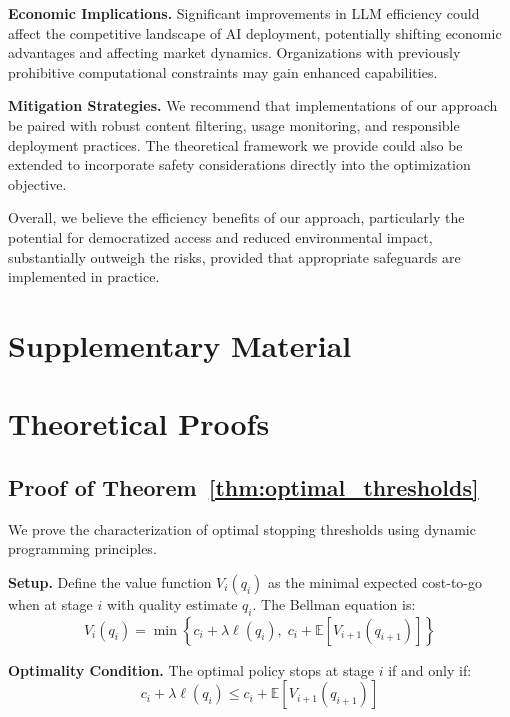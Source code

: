 \documentclass{article}
\theoremstyle{plain}
\theoremstyle{definition}
\theoremstyle{remark}
\begin{document}
\textbf{Economic Implications.} Significant improvements in LLM efficiency could affect the competitive landscape of AI deployment, potentially shifting economic advantages and affecting market dynamics. Organizations with previously prohibitive computational constraints may gain enhanced capabilities.

\textbf{Mitigation Strategies.} We recommend that implementations of our approach be paired with robust content filtering, usage monitoring, and responsible deployment practices. The theoretical framework we provide could also be extended to incorporate safety considerations directly into the optimization objective.

Overall, we believe the efficiency benefits of our approach, particularly the potential for democratized access and reduced environmental impact, substantially outweigh the risks, provided that appropriate safeguards are implemented in practice.





\newpage
\appendix
\onecolumn

\section*{\LARGE Supplementary Material}
\label{sec:appendix}

\section{Theoretical Proofs}
\label{app:proofs}

\subsection{Proof of Theorem~\ref{thm:optimal_thresholds}}

We prove the characterization of optimal stopping thresholds using dynamic programming principles.

\textbf{Setup.} Define the value function $V_i(q_i)$ as the minimal expected cost-to-go when at stage $i$ with quality estimate $q_i$. The Bellman equation is:
\begin{equation}
V_i(q_i) = \min\left\{c_i + \lambda \ell(q_i), \; c_i + \mathbb{E}[V_{i+1}(q_{i+1})]\right\}
\end{equation}

\textbf{Optimality Condition.} The optimal policy stops at stage $i$ if and only if:
\begin{equation}
c_i + \lambda \ell(q_i) \leq c_i + \mathbb{E}[V_{i+1}(q_{i+1})]
\end{equation}
\end{document}
